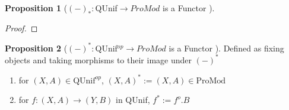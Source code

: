 \documentclass[18pt,a4paper]{article}
\theoremstyle{definition}
\newtheorem{proop}{Proposition}[section]
\begin{document}
	\begin{proop}[$(-)_*:$QUnif$\to ProMod$ is a Functor ]

	\end{proop}
	\begin{proof}

	\end{proof}

	\begin{proop}[$(-)^*:$QUnif$^{op} \to ProMod$ is a Functor ]
		Defined as fixing objects and taking morphisms to their image under $(-)^*$
		\begin{enumerate}[label=(\alph*)]
			\item for $(X,A) \in \text{QUnif}^{op}$, $(X,A)^*:=(X,A) \in \text{ProMod}$
			\item for $f:(X,A) \to (Y,B)$ in QUnif,
				$f^* := f^o .B$
		\end{enumerate}
	\end{proop}
\end{document}
